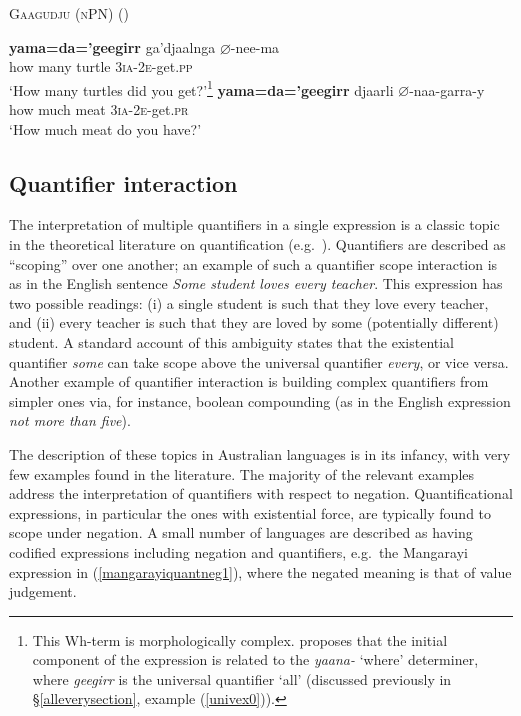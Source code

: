 \documentclass[12pt,egregdoesnotlikesansseriftitles]{scrartcl}
\begin{document}
\begin{exe}
  \ex \textsc{Gaagudju (nPN)} \hfill (\citealt[232]{harvey92})
  \begin{xlist}
    \ex \gll \textbf{yama=da='geegirr} ga'djaalnga $\varnothing$-nee-ma\\
    {how many} turtle 3\textsc{ia}-2\textsc{e}-get.\textsc{pp} \\
    \glt `How many turtles did you get?'\footnote{This Wh-term is morphologically complex. \citet[232]{harvey92} proposes that the initial component of the expression is related to the \textit{yaana-} `where' determiner, where \textit{geegirr} is the universal quantifier `all' (discussed previously in \S\ref{alleverysection}, example (\ref{univex0})).}
    \ex \gll \textbf{yama=da='geegirr} djaarli $\varnothing$-naa-garra-y\\
    {how much} meat 3\textsc{ia}-2\textsc{e}-get.\textsc{pr} \\
    \glt `How much meat do you have?' %
  \end{xlist}
\end{exe}


\subsection{Quantifier interaction}
\label{sec:qfrscope}
The interpretation of multiple quantifiers in a single expression is a classic topic in the theoretical literature on quantification (e.g.\ \citealt{szab97}). Quantifiers are described as ``scoping'' over one another; an example of such a quantifier scope interaction is as in the English sentence \textit{Some student loves every teacher}. This expression has two possible readings: (i) a single student is such that they love every teacher, and (ii) every teacher is such that they are loved by some (potentially different) student. A standard account of this ambiguity states that the existential quantifier \textit{some} can take scope above the universal quantifier \textit{every}, or vice versa. Another example of quantifier interaction is building complex quantifiers from simpler ones via, for instance, boolean compounding (as in the English expression \textit{not more than five}).

The description of these topics in Australian languages is in its infancy, with very few examples found in the literature. The majority of the relevant examples address the interpretation of quantifiers with respect to negation. Quantificational expressions, in particular the ones with existential force, are typically found to scope under negation. A small number of languages are described as having codified expressions including negation and quantifiers, e.g.\ the Mangarayi expression in (\ref{mangarayiquantneg1}), where the negated meaning is that of value judgement.
\end{document}
